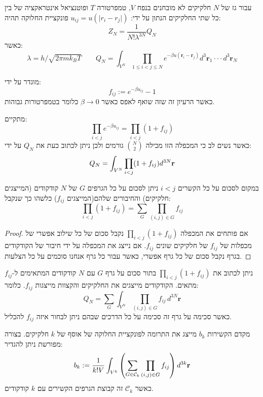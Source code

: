 \documentclass{tstextbook}
\begin{document}
\begin{proposition}
עבור גז של \(N\) חלקיקים לא מובחנים בנפח \(V\), טמפרטורה \(T\) ופוטנציאל אינטראקציה של בין כל שתי החלקיקים הנתון על ידי: \(u_{ij}=u(\lvert r_{i}-r_{j} \rvert)\) פונקציית החלוקה תהיה:
$$Z_{N}=\frac{1}{N!\lambda^{3N}}Q_{N}$$
כאשר:
$$\lambda=h / \sqrt{ 2\pi mk_{B}T }\qquad Q_{N}=\int_{V^{N}}\prod_{1\leq i<j\leq N}e^{-\beta u(\mathbf{r}_{i}-\mathbf{r}_{j})}d^{3}\mathbf{r}_{1}\cdot\cdot\cdot d^{3}\mathbf{r}_{N}$$

\end{proposition}
\begin{definition}
מוגדר על ידי:
$$f_{i j}:=e^{-\beta u_{i j}}-1$$
כאשר הרעיון זה שזה שואף לאפס כאשר \(\beta\to 0\) כלומר בטמפרטורות גבוהות.

\end{definition}
\begin{corollary}
מתקיים:
$$\prod_{i<j}e^{-\beta u_{i j}}=\prod_{i<j}(1+f_{i j})$$
כאשר נשים לב כי המכפלה הזו מכילה \({N\choose 2}\) גורמים ולכן ניתן לכתוב כעת את \(Q_{N}\) על ידי:
$$Q_{N}=\int_{V^{N}}\prod_{i<j}(1+f_{i j})d^{3N}{\bf r}$$

\end{corollary}
\begin{lemma}
במקום לסכום על כל הקשרים \(i<j\) ניתן לסכום על כל הגרפים \(G\) של \(N\) קודקודים (המייצגים חלקיקים) והחיבורים שלהם(המייצגים \(f_{ij}\)) כלשהו כך שנקבל:
$$\prod_{i<j}(1+f_{i j})=\sum_{G}\prod_{(i,j)\in G}f_{i j}$$

\end{lemma}
\begin{proof}
אם פותחים את המכפלה \(\prod_{i<j}(1+f_{i j})\) נקבל סכום של כל שילוב אפשרי של מכפלות של \(f_{ij}\) של חלקיקים שונים \(f_{ij}\). אם נייצג את המכפלה על ידי חיבור של הקודקודים בגרף נקבל סכום של כל גרף אפשרי, כאשר עבור כל גרף אנחנו סוכמים על כל הצלעות.

\end{proof}
\begin{corollary}
ניתן לכתוב את \(\prod_{i<j}(1+f_{ij})\) בתור סכום על גרף \(G\) עם \(N\) קודקודים המתאימים ל-\(f_{ij}\) מתאים. הקודקודים מייצגים את החלקיקים והקצוות מייצגות \(f_{ij}\). כלומר:
$$Q_{N}=\sum_{G}\int_{V^{N}}\prod_{(i,j)\in G}f_{i j}\,d^{3N}\mathbf{r}$$
כאשר סכימה על גרף זה סכימה על כל הדרכים שבהם ניתן לבחור איזה \(f_{ij}\) להכליל.

\end{corollary}
\begin{definition}
מקדם הקשירות \(b_{k}\) מייצג את התרומה לפונקציית החלוקה של אוסף של \(k\) חלקיקים. בצורה מפורשת ניתן להגדיר:
$$b_{k}:=\frac{1}{k!V}\int_{V^{k}}\left(\sum_{G\in{\mathcal{C}}_{k}}\prod_{(i,j)\in G}f_{i j}\right)d^{3k}{\bf r}$$
כאשר \(\mathcal{C}_{k}\) זה קבוצת הגרפים הקשירים עם \(k\) קודקודים.

\end{definition}
\end{document}
